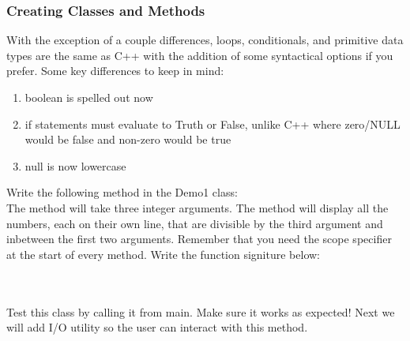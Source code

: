 \documentclass[../../main.tex]{subfiles}
\begin{document}
\subsubsection{Creating Classes and Methods}
   \begin{steps}
      \item With the exception of a couple differences, loops, conditionals, and primitive
         data types are the same as C++ with the addition of some syntactical options if
         you prefer. Some key differences to keep in mind:
   \begin{enumerate}[label=\Alph*.]
      \item boolean is spelled out now
      \item if statements must evaluate to Truth or False, unlike C++ where zero/NULL
         would be false and non-zero would be true
      \item null is now lowercase
   \end{enumerate}
   \item Write the following method in the Demo1 class: \\
      The method will take three integer arguments. The method will display all the numbers,
      each on their own line, that are divisible by the third argument and inbetween the first
      two arguments. Remember that you need the scope specifier at the start of every method.
      Write the function signiture below: \\
      \vspace{1cm}\\
      \underline{\hspace{15cm}}\\
      \item Test this class by calling it from main. Make sure it works as expected!
         Next we will add I/O utility so the user can interact with this method.

\end{steps}
\end{document}
